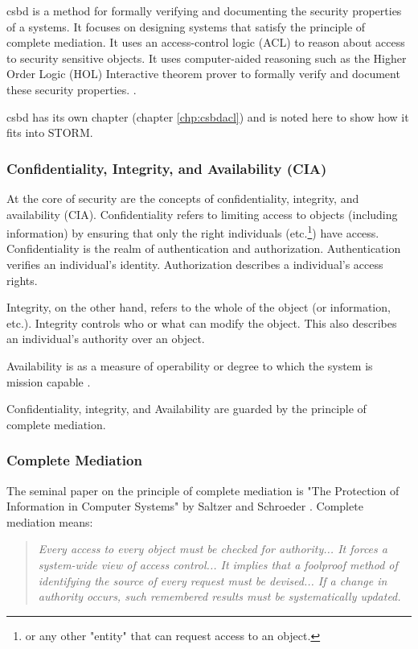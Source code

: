 \documentclass[../../main/main.tex]{subfiles}
\begin{document}
\gls{csbd} is a method for formally verifying and documenting the security properties of a systems.  It focuses on designing systems that satisfy the principle of complete mediation.  It uses an access-control logic (ACL) to reason about access to security sensitive objects.  It uses computer-aided reasoning such as the Higher Order Logic (HOL) Interactive theorem prover to formally verify and document these security properties.  .

\gls{csbd} has its own chapter (chapter \ref{chp:csbdacl}) and is noted here to show how it fits into STORM.

\subsubsection{Confidentiality, Integrity, and Availability (CIA) }\label{sssect:ssmts}
At the core of security are the concepts of confidentiality, integrity, and availability (CIA).  Confidentiality refers to limiting access to objects (including information) by ensuring that only the right individuals (etc.\footnote{or any other "entity" that can request access to an object.}) have access.  Confidentiality is the realm of authentication and authorization.  Authentication verifies an individual's identity.  Authorization describes a individual's access rights. 

Integrity, on the other hand, refers to the whole of the object (or information, etc.). Integrity controls who or what can modify the object. This also describes an individual's authority over an object.

Availability is as a measure of operability or degree to which the system is mission capable \cite {availability}. 

Confidentiality, integrity, and Availability are guarded by the principle of complete mediation.  


\subsubsection{Complete Mediation}\label{sssec:strommediate}
The seminal paper on the principle of complete mediation is "The Protection of Information in Computer Systems" by Saltzer and Schroeder \cite{saltzer}.  Complete mediation means:
\begin{quote}
\textit{
Every access to every object must be checked for authority... It forces a system-wide view of access control... It implies that a foolproof method of identifying the source of every request must be devised... If a change in authority occurs, such remembered results must be systematically updated.} 
\end{quote}
\end{document}
